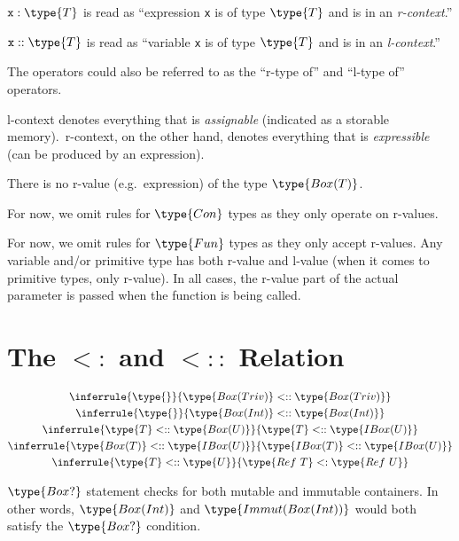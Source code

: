 \documentclass[11pt]{article}
\newcommand\subtype{\mathrel{<:}}
\newcommand\subtypecont{\mathrel{<::}}
\newcommand{\syntax}{\texttt}
\begin{document}
$\syntax{x} : \type{T}$ is read as ``expression \syntax{x} is of type
$\type{T}$ and is in an \textit{r-context}.''

$\syntax{x} :: \type{T}$ is read as ``variable \syntax{x} is of type $\type{T}$
and is in an \textit{l-context}.''

The operators could also be referred to as the ``r-type of'' and ``l-type of''
operators.

\medskip

l-context denotes everything that is \textit{assignable} (indicated as a
storable memory).\ r-context, on the other hand, denotes everything that is
\textit{expressible} (can be produced by an expression).

\medskip

There is no r-value (e.g.\ expression) of the type $\type{Box(T)}$.

\medskip

For now, we omit rules for $\type{Con}$ types as they only operate on r-values.

\medskip

For now, we omit rules for $\type{Fun}$ types as they only accept r-values.
Any variable and/or primitive type has both r-value and l-value (when it comes
to primitive types, only r-value). In all cases, the r-value part of the actual
parameter is passed when the function is being called.


\section*{The $\subtype$ and $\subtypecont$ Relation}

\begin{gather}
  \inferrule{\type{}}{\type{Box(Triv)} \subtypecont \type{Box(Triv)}}\\
  \inferrule{\type{}}{\type{Box(Int)} \subtypecont \type{Box(Int)}}\\
  \inferrule{\type{T} \subtypecont \type{Box(U)}}{\type{T} \subtypecont \type{IBox(U)}}\\
  \inferrule{\type{Box(T)} \subtypecont \type{IBox(U)}}{\type{IBox(T)} \subtypecont \type{IBox(U)}}\\
  \inferrule{\type{T} \subtypecont \type{U}}{\type{Ref\ T} \subtype \type{Ref\ U}}
\end{gather}

$\type{Box?}$ statement checks for both mutable and immutable containers.
In other words, $\type{Box(Int)}$ and $\type{Immut(Box(Int))}$ would both
satisfy the $\type{Box?}$ condition.

\end{document}
